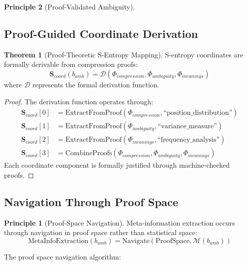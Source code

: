 \documentclass[12pt,a4paper]{article}
\theoremstyle{definition}
\newtheorem{theorem}{Theorem}
\newtheorem{principle}{Principle}
\begin{document}
\begin{principle}[Proof-Validated Ambiguity]
\subsection{Proof-Guided Coordinate Derivation}

\begin{theorem}[Proof-Theoretic S-Entropy Mapping]
S-entropy coordinates are formally derivable from compression proofs:
\begin{equation}
\mathbf{S}_{coord}(b_{amb}) = \mathcal{D}(\Phi_{compression}, \Phi_{ambiguity}, \Phi_{meanings})
\end{equation}
where $\mathcal{D}$ represents the formal derivation function.
\end{theorem}

\begin{proof}
The derivation function operates through:
\begin{align}
\mathbf{S}_{coord}[0] &= \text{ExtractFromProof}(\Phi_{compression}, \text{``position\_distribution''}) \\
\mathbf{S}_{coord}[1] &= \text{ExtractFromProof}(\Phi_{ambiguity}, \text{``variance\_measure''}) \\
\mathbf{S}_{coord}[2] &= \text{ExtractFromProof}(\Phi_{meanings}, \text{``frequency\_analysis''}) \\
\mathbf{S}_{coord}[3] &= \text{CombineProofs}(\Phi_{compression}, \Phi_{ambiguity}, \Phi_{meanings})
\end{align}
Each coordinate component is formally justified through machine-checked proofs.
\end{proof}

\subsection{Navigation Through Proof Space}

\begin{principle}[Proof-Space Navigation]
Meta-information extraction occurs through navigation in proof space rather than statistical space:
\begin{equation}
\text{MetaInfoExtraction}(b_{amb}) = \text{Navigate}(\text{ProofSpace}, \mathcal{M}(b_{amb}))
\end{equation}
\end{principle}

The proof space navigation algorithm:


\end{principle}
\end{document}
